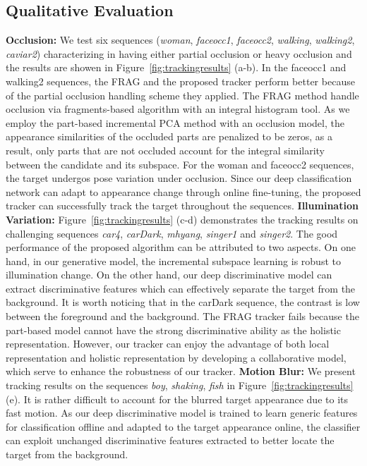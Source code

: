 \documentclass[preprint,12pt,review]{elsarticle}
\begin{document}
\subsection{Qualitative Evaluation} \label{QE}{\flushleft \bf{Occlusion:}}
We test six sequences (\emph{woman}, \emph{faceocc1}, \emph{faceocc2}, \emph{walking}, \emph{walking2}, \emph{caviar2}) characterizing in having either partial occlusion or heavy occlusion and the results are showen in Figure~\ref{fig:trackingresults} (a-b).
In the faceocc1 and walking2 sequences, the FRAG and the proposed tracker perform better because of the partial occlusion handling scheme they applied.
The FRAG method handle occlusion via fragments-based algorithm with an integral histogram tool.
As we employ the part-based incremental PCA method with an occlusion model, the appearance similarities of the occluded parts are penalized to be zeros, as a result, only parts that are not occluded account for the integral similarity between the candidate and its subspace.
For the woman and faceocc2 sequences, the target undergos pose variation under occlusion.
Since our deep classification network can adapt to appearance change through online fine-tuning, the proposed tracker can successfully track the target throughout the sequences.
{\flushleft \bf{Illumination Variation:}}
Figure~\ref{fig:trackingresults} (c-d) demonstrates the tracking results on challenging sequences \emph{car4}, \emph{carDark}, \emph{mhyang}, \emph{singer1} and \emph{singer2}.
The good performance of the proposed algorithm can be attributed to two aspects.
On one hand, in our generative model, the incremental subspace learning is robust to illumination change.
On the other hand, our deep discriminative model can extract discriminative features which can effectively separate the target from the background.
It is worth noticing that in the carDark sequence, the contrast is low between the foreground and the background.
The FRAG tracker fails because the part-based model cannot have the strong discriminative ability as the holistic representation.
However, our tracker can enjoy the advantage of both local representation and holistic representation by developing a collaborative model, which serve to enhance the robustness of our tracker.
{\flushleft \bf{Motion Blur:}}
We present tracking results on the sequences \emph{boy}, \emph{shaking}, \emph{fish} in Figure~\ref{fig:trackingresults} (e).
It is rather difficult to account for the blurred target appearance due to its fast motion.
As our deep discriminative model is trained to learn generic features for classification offline and adapted to the target appearance online, the classifier can exploit unchanged discriminative features extracted to better locate the target from the background.
\end{document}
